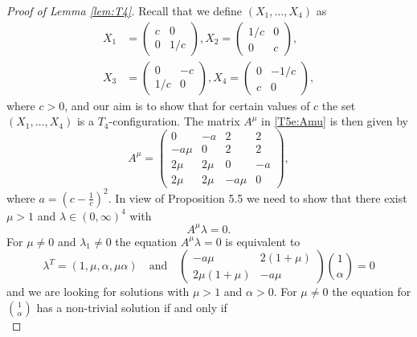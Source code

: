 \documentclass[titlepage]{amsart}
\numberwithin{equation}{section}
\theoremstyle{plain}
\theoremstyle{definition}
\theoremstyle{remark}
\begin{document}
\begin{proof}[Proof of Lemma \ref{lem:T4}] 
Recall that we define $(X_1,\dots,X_4)$ as
\begin{equation}\label{e:T4example}
\begin{split}
	X_1&=\begin{pmatrix}c&0\\0&1/c\end{pmatrix}, X_2=\begin{pmatrix}1/c&0\\0&c\end{pmatrix},\\ X_3&=\begin{pmatrix}0&-c\\1/c&0\end{pmatrix}, X_4=\begin{pmatrix}0&-1/c\\c&0\end{pmatrix},
	\end{split}
\end{equation}
where $c>0$, and our aim is to show that for certain values of $c$ the set $(X_1,\dots,X_4)$ is a $T_4$-configuration. The matrix $A^{\mu}$ in  \eqref{T5e:Amu} is then given by 
\begin{equation} \label{eq:Amu_X}
A^\mu = \begin{pmatrix} 
0 &    -a &  2   & 2\\
-a\mu  & 0 & 2 & 2 \\
2\mu  & 2\mu  & 0 & -a \\
2\mu  & 2\mu  & -a\mu  & 0
\end{pmatrix},
\end{equation}
where $a=(c-\frac{1}{c})^2$. 
In view of Proposition 5.5 we need to show that there exist $\mu > 1$ and $ \lambda \in (0,\infty)^4$   with
$$ A^\mu \lambda = 0.$$
For $\mu \ne 0$ and $\lambda_1\neq 0$ the equation $A^\mu \lambda = 0$  is equivalent to
\begin{equation} \label{eq:lambda_reduced}
\lambda^T =(1, \mu , \alpha, \mu \alpha) \quad
\text{and} \quad
\begin{pmatrix} -a \mu &  2 (1 + \mu) \\
2 \mu(1 + \mu) & -a\mu
\end{pmatrix}
\binom{1}{\alpha} = 0
\end{equation}
and we are looking for  solutions with $\mu >1$ and $\alpha > 0$. For $\mu \ne 0$ the 
equation for $\binom{1}{\alpha}$ has a non-trivial solution if and only if 
\begin{equation}  \label{eq:det_zero}

\end{equation}
\end{proof}
\end{document}
